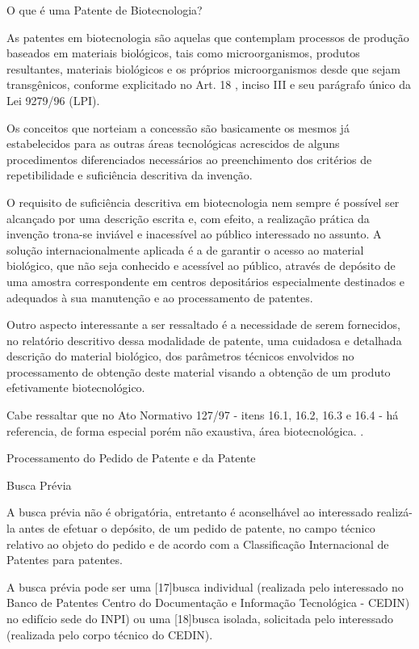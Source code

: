 \documentclass[12pt]{article}
\begin{document}
O que é uma Patente de Biotecnologia?

As patentes em biotecnologia são aquelas que contemplam processos de
produção baseados em materiais biológicos, tais como microorganismos,
produtos resultantes, materiais biológicos e os próprios
microorganismos desde que sejam transgênicos, conforme explicitado no
Art. 18 , inciso III e seu parágrafo único da Lei 9279/96 (LPI).

Os conceitos que norteiam a concessão são basicamente os mesmos já
estabelecidos para as outras áreas tecnológicas acrescidos de alguns
procedimentos diferenciados necessários ao preenchimento dos critérios
de repetibilidade e suficiência descritiva da invenção.

O requisito de suficiência descritiva em biotecnologia nem sempre é
possível ser alcançado por uma descrição escrita e, com efeito, a
realização prática da invenção trona-se inviável e inacessível ao
público interessado no assunto. A solução internacionalmente aplicada
é a de garantir o acesso ao material biológico, que não seja conhecido
e acessível ao público, através de depósito de uma amostra
correspondente em centros depositários especialmente destinados e
adequados à sua manutenção e ao processamento de patentes.

Outro aspecto interessante a ser ressaltado é a necessidade de serem
fornecidos, no relatório descritivo dessa modalidade de patente, uma
cuidadosa e detalhada descrição do material biológico, dos parâmetros
técnicos envolvidos no processamento de obtenção deste material
visando a obtenção de um produto efetivamente biotecnológico.

Cabe ressaltar que no Ato Normativo 127/97 - itens 16.1, 16.2, 16.3 e
16.4 - há referencia, de forma especial porém não exaustiva, área
biotecnológica. .


Processamento do Pedido de Patente e da Patente


Busca Prévia
     
A busca prévia não é obrigatória, entretanto é aconselhável ao
interessado realizá-la antes de efetuar o depósito, de um pedido de
patente, no campo técnico relativo ao objeto do pedido e de acordo com
a Classificação Internacional de Patentes para patentes.
     
A busca prévia pode ser uma [17]busca individual (realizada pelo
interessado no Banco de Patentes Centro do Documentação e Informação
Tecnológica - CEDIN) no edifício sede do INPI) ou uma [18]busca
isolada, solicitada pelo interessado (realizada pelo corpo técnico do
CEDIN).
\end{document}
